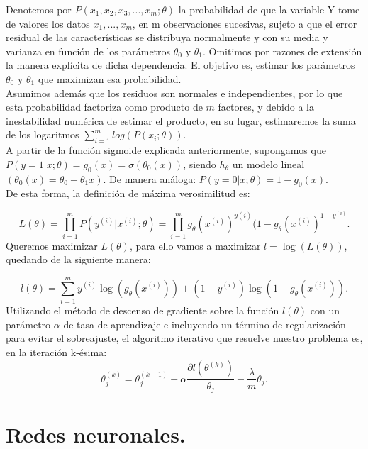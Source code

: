 \documentclass[a4paper,11pt]{article}
\begin{document}
\noindent
Denotemos por $P(x_1, x_2, x_3, ..., x_m; \theta)$ la probabilidad de que la variable Y tome
de valores los datos $x_1, ..., x_m$, en m observaciones sucesivas, sujeto a que el error
residual de las características se distribuya normalmente y con su media y varianza en función de los parámetros $\theta_0$ y $\theta_1$. Omitimos por razones de extensión la
manera explícita de dicha dependencia. El objetivo es, estimar
los parámetros $\theta_0$ y $\theta_1$ que maximizan esa probabilidad.\\

\noindent
Asumimos además que los residuos son normales e independientes, por lo que esta probabilidad factoriza como producto de $m$ factores, y debido a la inestabilidad
numérica de estimar el producto, en su lugar, estimaremos la suma de los logaritmos $\sum_{i=1}^m log(P(x_i ;\theta))$.\\

\noindent
A partir de la función sigmoide explicada anteriormente,
supongamos que $P(y = 1 | x; \theta) = g_0(x) = \sigma(\theta_0(x))$, siendo $h_{\theta}$ un
modelo lineal $(\theta_0(x) = \theta_0 + \theta_1 x)$. De manera análoga:  $P(y = 0 | x; \theta) = 1-g_0(x)$.\\

\noindent
De esta forma, la definición de máxima verosimilitud es:

\begin{equation}
L(\theta)=\prod_{i=1}^{m}P(y^{(i)}|x^{(i)};\theta)=\prod_{i=1}^{m}g_{\theta}(x^{(i)})^{y(i)}(1-g_{\theta}(x^{(i)})^{1-y^{(i)}}.
\end{equation}
Queremos maximizar $L(\theta)$,  para
ello vamos a maximizar $l = \log{(L(\theta))}$, quedando de la siguiente manera:

\begin{equation}
l(\theta)=\sum_{i=1}^my^{(i)}\log{(g_\theta(x^{(i)}))}+(1-y^{(i)})\log{(1-g_\theta(x^{(i)}))}.
\end{equation}
Utilizando el método de descenso de gradiente sobre la función $l(\theta)$ con un
parámetro $\alpha$ de tasa de aprendizaje e incluyendo un término de regularización
para evitar el sobreajuste, el algoritmo iterativo que resuelve nuestro problema
es, en la iteración k-ésima:
\begin{equation}
\theta_j^{(k)}=\theta_j^{(k-1)}-\alpha\frac{\partial l(\theta^{(k)})}{\theta_j}-\frac{\lambda}{m}\theta_j .
\end{equation}

\newpage
\section{Redes neuronales.}
\end{document}

